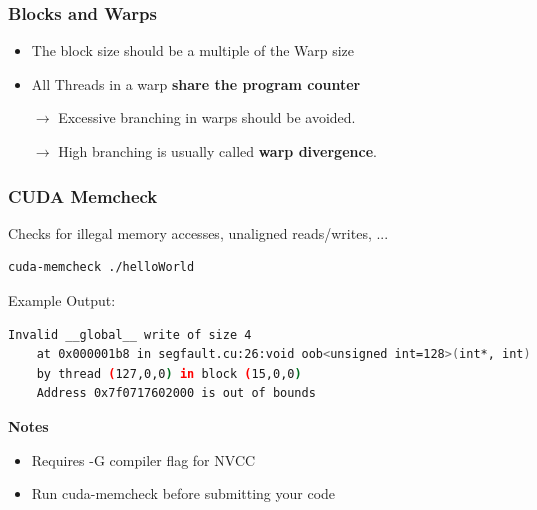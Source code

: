 \documentclass[aspectratio=169]{beamer}
\begin{document}
\begin{frame}[fragile]
	\frametitle{Blocks and Warps}
\begin{itemize}
	\item The block size should be a multiple of the Warp size
	\item All Threads in a warp \textbf{share the program counter}
	\item [$\rightarrow$] Excessive branching in warps should be avoided.
	\item [$\rightarrow$] High branching is usually called \textbf{warp divergence}.
\end{itemize}


\end{frame}




\begin{frame}[fragile]
\frametitle{CUDA Memcheck}
Checks for illegal memory accesses, unaligned reads/writes, ...
\begin{lstlisting}[language=bash]
cuda-memcheck ./helloWorld
\end{lstlisting}
Example Output:
\begin{lstlisting}[language=bash]
Invalid __global__ write of size 4
	at 0x000001b8 in segfault.cu:26:void oob<unsigned int=128>(int*, int)
	by thread (127,0,0) in block (15,0,0)
	Address 0x7f0717602000 is out of bounds
\end{lstlisting}
\textbf{Notes}
\begin{itemize}
\item Requires -G compiler flag for NVCC
\item Run cuda-memcheck before submitting your code
\end{itemize}

\end{frame}
\end{document}
